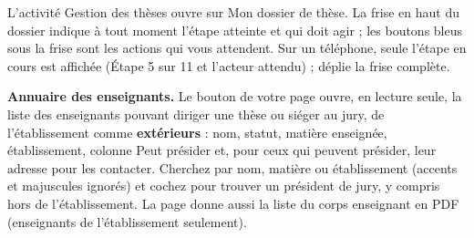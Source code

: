 \documentclass[11pt,a4paper]{article}
\begin{document}
L'activité \og Gestion des thèses\fg{} ouvre sur \og Mon dossier de thèse\fg{}.
La frise en haut du dossier indique à tout moment l'étape atteinte et qui doit
agir ; les boutons bleus sous la frise sont les actions qui vous attendent. Sur
un téléphone, seule l'étape en cours est affichée (\og Étape 5 sur 11\fg{} et
l'acteur attendu) ;  déplie la frise complète.



\begin{astuce}
\textbf{Annuaire des enseignants.} Le bouton 
de votre page ouvre, en lecture seule, la liste des enseignants pouvant diriger
une thèse ou siéger au jury, de l'établissement comme \textbf{extérieurs} : nom,
statut, matière enseignée, établissement, colonne \og Peut présider\fg{} et,
pour ceux qui peuvent présider, leur adresse pour les contacter.
Cherchez par nom, matière ou établissement (accents et majuscules ignorés) et
cochez  pour trouver un
président de jury, y compris hors de l'établissement. La page donne aussi la
liste du corps enseignant en PDF (enseignants de l'établissement seulement).
\end{astuce}
\end{document}

